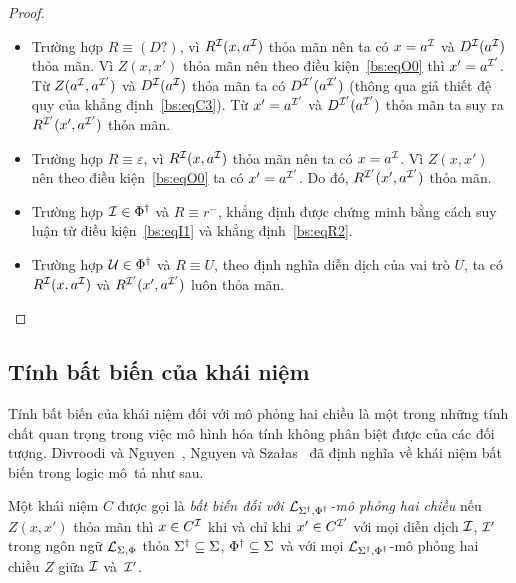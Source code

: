 \begin{proof}
\begin{itemize}
		\item Trường hợp $R \equiv (D?)$, vì $R^{\mathcal{I}}(x,a^{\mathcal{I}})$ thỏa mãn nên ta có $x=a^{\mathcal{I}}$ và $D^{\mathcal{I}}(a^{\mathcal{I}})$ thỏa mãn. Vì $Z(x,x')$ thỏa mãn nên theo điều kiện~\eqref{bs:eqO0} thì $x' = a^{\mathcal{I}'}$. Từ $Z(a^{\mathcal{I}}, a^{\mathcal{I}'})$ và $D^{\mathcal{I}}(a^{\mathcal{I}})$ thỏa mãn ta có $D^{\mathcal{I}'}(a^{\mathcal{I}'})$
		(thông qua giả thiết đệ quy của khẳng định~\eqref{bs:eqC3}). Từ $x'=a^{\mathcal{I}'}$ và $D^{\mathcal{I}'}(a^{\mathcal{I}'})$ thỏa mãn ta suy ra $R^{\mathcal{I}'}(x',a^{\mathcal{I}'})$ thỏa mãn.
		
		\item Trường hợp $R \equiv \varepsilon$, vì $R^{\mathcal{I}}(x,a^{\mathcal{I}})$ thỏa mãn nên ta có $x=a^{\mathcal{I}}$. Vì $Z(x,x')$ nên theo điều kiện~\eqref{bs:eqO0} ta có $x'=a^{\mathcal{I}'}$. Do đó, $R^{\mathcal{I}'}(x',a^{\mathcal{I}'})$ thỏa mãn.
		
		\item Trường hợp $\mathcal{I} \in \Phi^\dag$ và $R \equiv r^-$, khẳng định được chứng minh bằng cách suy luận từ điều kiện~\eqref{bs:eqI1} và khẳng định~\eqref{bs:eqR2}.
		
		\item Trường hợp $\mathcal{U} \in \Phi^\dag$ và $R \equiv U$, theo định nghĩa diễn dịch của vai trò $U$, ta  có $R^{\mathcal{I}}(x,a^{\mathcal{I}})$ và $R^{\mathcal{I}'}(x',a^{\mathcal{I}'})$ luôn thỏa mãn.
	\end{itemize}
	\vspace{-7.5ex}
\end{proof}

\subsection{Tính bất biến của khái niệm}
\label{sec:Chap2.ConceptInvariant}

Tính bất biến của khái niệm đối với mô phỏng hai chiều là một trong những tính chất quan trọng trong việc mô hình hóa tính không phân biệt được của các đối tượng. Divroodi và Nguyen~\cite{Divroodi2011B}, Nguyen và Sza{\l}as~\cite{Nguyen2013} đã định nghĩa về khái niệm bất biến trong logic mô~tả như sau.

\begin{Definition}
\label{def:InvariantConcept}
	Một khái niệm $C$ được gọi là {\em bất biến đối với $\mathcal{L}_{\Sigma^\dag,\Phi^\dag}$-mô phỏng hai chiều} nếu $Z(x, x')$ thỏa mãn thì $x \in C^{\mathcal{I}}$ khi và chỉ khi $x' \in C^{\mathcal{I}'}$ với mọi diễn dịch $\mathcal{I}$, $\mathcal{I}'$ trong ngôn ngữ $\mathcal{L}_{\Sigma,\Phi}$ thỏa $\Sigma^\dag \subseteq \Sigma$, $\Phi^\dag \subseteq \Sigma$ và với mọi $\mathcal{L}_{\Sigma^\dag,\Phi^\dag}$-mô phỏng hai chiều $Z$ giữa $\mathcal{I}$ và~$\mathcal{I}'$.\myend
\end{Definition}

